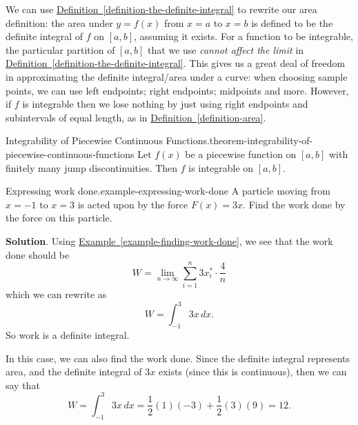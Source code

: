 \documentclass[10pt,]{book}
\numberwithin{equation}{section}
\begin{document}
\hypertarget{p-428}{}%
We can use \hyperref[definition-the-definite-integral]{Definition~\ref{definition-the-definite-integral}} to rewrite our area definition: the area under \(y=f(x)\) from \(x=a\) to \(x=b\) is defined to be the definite integral of \(f\) on \([a,b]\), assuming it exists. For a function to be integrable, the particular partition of \([a,b]\) that we use \emph{cannot affect the limit} in \hyperref[definition-the-definite-integral]{Definition~\ref{definition-the-definite-integral}}. This gives us a great deal of freedom in approximating the definite integral/area under a curve: when choosing sample points, we can use left endpoints; right endpoints; midpoints and more. However, if \(f\) is integrable then we lose nothing by just using right endpoints and subintervals of equal length, as in \hyperref[definition-area]{Definition~\ref{definition-area}}.%
\begin{theorem}{Integrability of Piecewise Continuous Functions.}{}{theorem-integrability-of-piecewise-continuous-functions}%
\hypertarget{p-429}{}%
Let \(f(x)\) be a piecewise function on \([a,b]\) with finitely many jump discontinuities. Then \(f\) is integrable on \([a,b]\).%
\end{theorem}
\begin{example}{Expressing work done.}{example-expressing-work-done}%
\hypertarget{p-430}{}%
A particle moving from \(x=-1\) to \(x=3\) is acted upon by the force \(F(x) = 3x\). Find the work done by the force on this particle.%
\par\smallskip%
\noindent\textbf{Solution}.\hypertarget{solution-94}{}\quad%
\hypertarget{p-431}{}%
Using \hyperref[example-finding-work-done]{Example~\ref{example-finding-work-done}}, we see that the work done should be%
\begin{equation*}
W = \lim_{n\to\infty}\sum_{i=1}^{n}3x_{i}^{*}\cdot\frac{4}{n}
\end{equation*}
which we can rewrite as%
\begin{equation*}
W = \int_{-1}^{3}3x\,dx.
\end{equation*}
So work is a definite integral.%
\par
\hypertarget{p-432}{}%
In this case, we can also find the work done. Since the definite integral represents area, and the definite integral of \(3x\) exists (since this is continuous), then we can say that%
\begin{equation*}
W = \int_{-1}^{3}3x\,dx = \frac{1}{2}(1)(-3) + \frac{1}{2}(3)(9) = 12.
\end{equation*}
%
\end{example}
\end{document}
